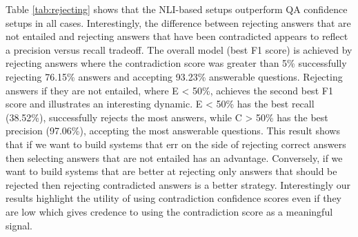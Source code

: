 \documentclass[11pt]{article}
\begin{document}
Table \ref{tab:rejecting} shows that the NLI-based setups outperform QA confidence setups in all cases. Interestingly, the difference between rejecting answers that are not entailed and rejecting answers that have been contradicted appears to reflect a precision versus recall tradeoff. The overall model (best F1 score) is achieved by rejecting answers where the contradiction score was greater than 5\% successfully rejecting 76.15\% answers and accepting 93.23\% answerable questions. Rejecting answers if they are not entailed, where E < 50\%, achieves the second best F1 score and illustrates an interesting dynamic. E < 50\% has the best recall (38.52\%), successfully rejects the most answers, while C > 50\% has the best precision (97.06\%), accepting the most answerable questions. This result shows that if we want to build systems that err on the side of rejecting correct answers then selecting answers that are not entailed has an advantage. Conversely, if we want to build systems that are better at rejecting only answers that should be rejected then rejecting contradicted answers is a better strategy. Interestingly our results highlight the utility of using contradiction confidence scores even if they are low which gives credence to using the contradiction score as a meaningful signal.
\end{document}

